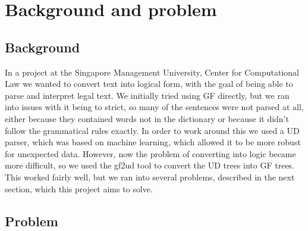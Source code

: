\chapter{Background and problem}




% 

\section{Background}\label{sect:background}

In a project\cite{listenmaa-etal-2021-towards} at the Singapore Management University, Center for Computational Law we wanted to convert text into logical form, with the goal of being able to parse and interpret legal text. We initially tried using GF directly, but we ran into issues with it being to strict, so many of the sentences were not parsed at all, either because they contained words not in the dictionary or because it didn't follow the grammatical rules exactly. In order to work around this we used a UD parser, which was based on machine learning, which allowed it to be more robust for unexpected data. However, now the problem of converting into logic became more difficult, so we used the gf2ud tool to convert the UD trees into GF trees. This worked fairly well, but we ran into several problems, described in the next section, which this project aims to solve.

\section{Problem}



